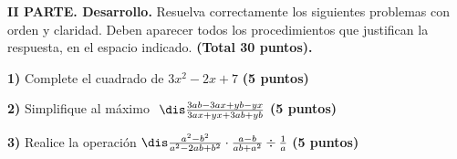 \documentclass[12pt, fleqn]{article}
\begin{document}













{\bf II PARTE. Desarrollo.} Resuelva correctamente los siguientes problemas con orden y claridad. Deben aparecer todos los procedimientos que justifican la respuesta, en el espacio indicado.  {\bf (Total 30 puntos).} \vp

{\bf 1)} Complete el cuadrado de $3x^2-2x+7$ \hfill {\bf (5 puntos)}

\vs\vs\vs\vs\vs\vs\vs\vs\vs\vs\vs\vs\vs

{\bf 2)} Simplifique al máximo  $\,\,\dis\frac{3ab-3ax+yb-yx}{3ax+yx+3ab+yb}$ \hfill {\bf (5 puntos)}

\vs\vs\vs\vs\vs\vs\vs\vs\vs\vs\vs\vs\vs

{\bf 3)} Realice la operación $\dis\frac{a^2-b^2}{a^2-2ab+b^2}\cdot\frac{a-b}{ab+a^2}\div\frac{1}{a}$ \hfill {\bf (5 puntos)}


\pagebreak


\end{document}
